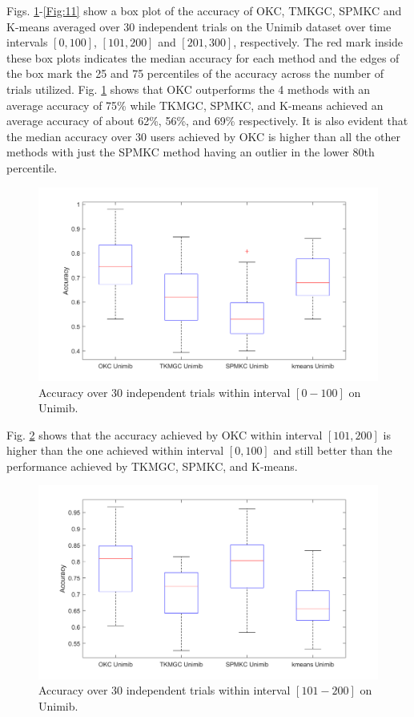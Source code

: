 \documentclass[10pt,final]{IEEEtran}
\begin{document}
Figs. \ref{Fig:9}-\ref{Fig:11} show a box plot of the accuracy of OKC, TMKGC, SPMKC and K-means averaged over $30$ independent trials on the Unimib dataset over time intervals $[0,100]$, $[101,200]$ and $[201,300]$, respectively. The red mark inside these box plots indicates the median accuracy for each method and the edges of the box mark the 25 and 75 percentiles of the accuracy across the number of trials utilized. Fig. \ref{Fig:9} shows that OKC outperforms the 4 methods with an average accuracy of 75\% while TKMGC, SPMKC, and K-means achieved an average accuracy of about 62\%, 56\%, and 69\% respectively. It is also evident that the median accuracy over 30 users achieved by OKC is higher than all the other methods with just the SPMKC method having an outlier in the lower 80th percentile. 
\begin{figure}[htp]
    \centering
    \includegraphics[scale=0.18]{boxplot_4_methods_0-100.png}
    \caption{Accuracy over 30 independent trials within interval $[0-100]$ on Unimib.}
    \label{Fig:9}
\end{figure}
Fig. \ref{Fig:10} shows that  the accuracy achieved by OKC within interval  $[101,200]$ is  higher than the one achieved within interval $[0,100]$ and still better than the performance achieved by TKMGC, SPMKC, and K-means.
\begin{figure}[htp]
    \centering
    \includegraphics[scale=0.18]{boxplot_4_methods_101-200.png}
    \caption{Accuracy over 30 independent trials within interval $[101-200]$ on Unimib.}
    \label{Fig:10}
\end{figure}
\end{document}

